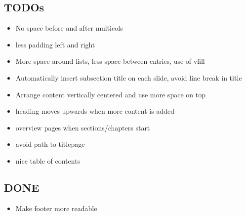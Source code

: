 \subsection{TODOs}
\begin{frame}{\insertsubsection}
	\begin{itemize}
		\item No space before and after multicols
		\item less padding left and right
		\item More space around lists, less space between entries, use of vfill
		\item Automatically insert subsection title on each slide, avoid line break in title
		\item Arrange content vertically centered and use more space on top
		\item heading moves upwards when more content is added
		\item overview pages when sections/chapters start
		\item avoid path to titlepage
		\item nice table of contents
	\end{itemize}
\end{frame}

\subsection{DONE}
\begin{frame}{\insertsubsection}
	\begin{itemize}
		\item Make footer more readable
	\end{itemize}
\end{frame}


